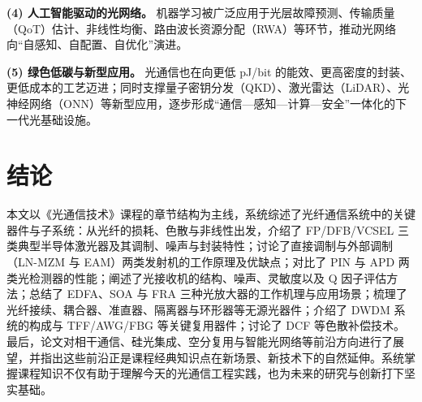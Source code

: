 \documentclass[a4paper,11pt,UTF8,fontset=fandol]{ctexart}
\begin{document}
\textbf{(4) 人工智能驱动的光网络。} 机器学习被广泛应用于光层故障预测、传输质量（QoT）估计、非线性均衡、路由波长资源分配（RWA）等环节，推动光网络向“自感知、自配置、自优化”演进。

\textbf{(5) 绿色低碳与新型应用。} 光通信也在向更低 pJ/bit 的能效、更高密度的封装、更低成本的工艺迈进；同时支撑量子密钥分发（QKD）、激光雷达（LiDAR）、光神经网络（ONN）等新型应用，逐步形成“通信—感知—计算—安全”一体化的下一代光基础设施。

\section{结论}

本文以《光通信技术》课程的章节结构为主线，系统综述了光纤通信系统中的关键器件与子系统：从光纤的损耗、色散与非线性出发，介绍了 FP/DFB/VCSEL 三类典型半导体激光器及其调制、噪声与封装特性；讨论了直接调制与外部调制（LN-MZM 与 EAM）两类发射机的工作原理及优缺点；对比了 PIN 与 APD 两类光检测器的性能；阐述了光接收机的结构、噪声、灵敏度以及 Q 因子评估方法；总结了 EDFA、SOA 与 FRA 三种光放大器的工作机理与应用场景；梳理了光纤接续、耦合器、准直器、隔离器与环形器等无源光器件；介绍了 DWDM 系统的构成与 TFF/AWG/FBG 等关键复用器件；讨论了 DCF 等色散补偿技术。最后，论文对相干通信、硅光集成、空分复用与智能光网络等前沿方向进行了展望，并指出这些前沿正是课程经典知识点在新场景、新技术下的自然延伸。系统掌握课程知识不仅有助于理解今天的光通信工程实践，也为未来的研究与创新打下坚实基础。
\end{document}
